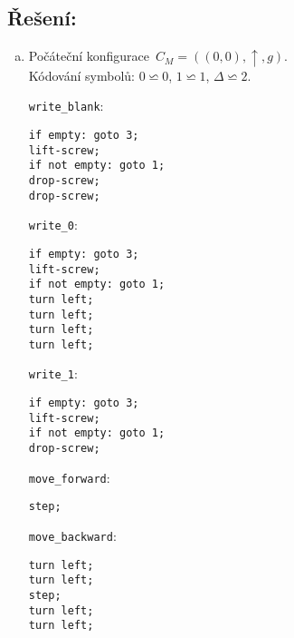 \documentclass[a4paper, 11pt]{scrartcl}
\begin{document}
	\subsection*{Řešení:}

	\begin{enumerate}[(a)]
		\item
			Počáteční konfigurace~$ C_M = ((0, 0), \uparrow, g) $. \\
			Kódování symbolů: $ 0 \backsimeq 0 $, $ 1 \backsimeq 1 $,
			$ \Delta \backsimeq 2 $.

			\texttt{write\_blank}:
			\begin{lstlisting}
if empty: goto 3;
lift-screw;
if not empty: goto 1;
drop-screw;
drop-screw;
			\end{lstlisting}

			\texttt{write\_0}:
			\begin{lstlisting}
if empty: goto 3;
lift-screw;
if not empty: goto 1;
turn left;
turn left;
turn left;
turn left;
			\end{lstlisting}

			\newpage
			\texttt{write\_1}:
			\begin{lstlisting}
if empty: goto 3;
lift-screw;
if not empty: goto 1;
drop-screw;
			\end{lstlisting}

			\texttt{move\_forward}:
			\begin{lstlisting}
step;
			\end{lstlisting}

			\texttt{move\_backward}:
			\begin{lstlisting}
turn left;
turn left;
step;
turn left;
turn left;
			\end{lstlisting}
	\end{enumerate}
\end{document}
